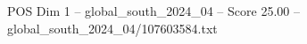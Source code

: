 \begin{textsample}{POS Dim 1 – global\_south\_2024\_04 – Score 25.00 – global\_south\_2024\_04/107603584.txt}
\end{textsample}
